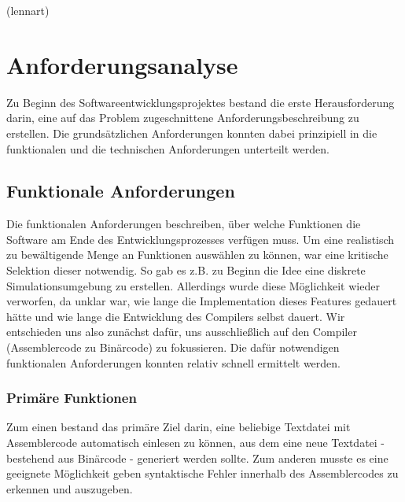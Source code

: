 \documentclass[paper=a4,fontsize=12pt,twocolumn]{scrreprt}
\begin{document}
(lennart)

\section{Anforderungsanalyse}
Zu Beginn des Softwareentwicklungsprojektes bestand die erste Herausforderung darin, eine auf das Problem zugeschnittene Anforderungsbeschreibung zu erstellen.
Die grundsätzlichen Anforderungen konnten dabei prinzipiell in die funktionalen und die technischen Anforderungen unterteilt werden. 

\subsection{Funktionale Anforderungen}
Die funktionalen Anforderungen beschreiben, über welche Funktionen die Software am Ende des Entwicklungsprozesses verfügen muss.
Um eine realistisch zu bewältigende Menge an Funktionen auswählen zu können, war eine  kritische Selektion dieser notwendig.
So gab es z.B. zu Beginn die Idee eine diskrete Simulationsumgebung zu erstellen. Allerdings wurde diese Möglichkeit wieder verworfen, da unklar war, wie lange die Implementation dieses Features gedauert hätte und wie lange die Entwicklung des Compilers selbst dauert.
Wir entschieden uns also zunächst dafür, uns ausschließlich auf den Compiler (Assemblercode zu Binärcode) zu fokussieren.
Die dafür notwendigen funktionalen Anforderungen konnten relativ schnell ermittelt werden.

\subsubsection{Primäre Funktionen}
Zum einen bestand das primäre Ziel darin, eine beliebige Textdatei mit Assemblercode automatisch einlesen zu können, aus dem eine neue Textdatei - bestehend aus Binärcode - generiert werden sollte.
Zum anderen musste es eine geeignete Möglichkeit geben syntaktische Fehler innerhalb des Assemblercodes zu erkennen und auszugeben.
\end{document}
